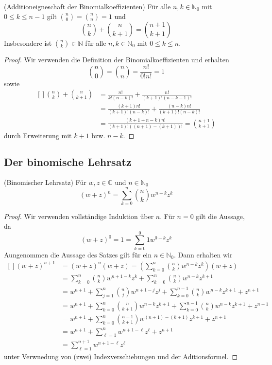 \documentclass[../Analysis1_script.tex]{subfiles}
\begin{document}
\begin{proposition}{(Additioneigneschaft der Binomialkoeffizienten)}
	Für alle $n, k \in \mathbb{N}_0$ mit $0 \leq k \leq n - 1$  gilt $\binom{n}{0} = \binom{n}{n} = 1$ und 
	\[\binom{n}{k} + \binom{n}{k+1} = \binom{n+1}{k+1}\]
	Insbesondere ist $\binom{n}{k} \in \mathbb{N}$ für alle $n, k \in \mathbb{N}_0$ mit $0 \leq k \leq n$.
\end{proposition}

\begin{proof}
	Wir verwenden die Definition der Binomialkoeffizienten und erhalten
	\[\binom{n}{0} = \binom{n}{n} = \frac{n!}{0!n!} = 1\]
	sowie
	\[\begin{aligned}[]
		\binom{n}{k} + \binom{n}{k+1} &= \frac{n!}{k!(n-k)!} + \frac{n!}{(k+1)!(n-k-1)!}\\
		&= \frac{(k+1)n!}{(k+1)!(n-k)!} + \frac{(n-k)n!}{(k+1)!(n-k)!}\\
		&= \frac{(k + 1 + n - k)n!}{(k+1)!((n+1)-(k+1))!} = \binom{n+1}{k+1}
	\end{aligned}\]
	durch Erweiterung mit $k+1$ bzw. $n-k$.
\end{proof}


\subsection{Der binomische Lehrsatz}

\begin{proposition}{(Binomischer Lehrsatz)}
	Für $w, z \in \mathbb{C}$ und $n \in \mathbb{N}_0$
	\[(w + z)^n = \sum_{k=0}^n \binom{n}{k}w^{n-k} z^k\]
\end{proposition}

\begin{proof}
	Wir verwenden vollständige Induktion über $n$. Für $n=0$ gilt die Aussage, da
	\[(w + z)^0 = 1 = \sum_{k=0}^0 1w^{0-k} z^k\]
	Aungenommen die Aussage des Satzes gilt für ein $n \in \mathbb{N}_0$. Dann erhalten wir
	\[\begin{aligned}[]
		(w + z)^{n+1} &= (w + z)^{n}(w + z) = (\sum_{k=0}^n \binom{n}{k}w^{n-k}z^k)(w + z)\\
		&= \sum_{k=0}^n \binom{n}{k}w^{n+1-k}z^k + \sum_{k=0}^n \binom{n}{k}w^{n-k}z^{k+1}\\
		&= w^{n+1} + \sum_{j=1}^n \binom{n}{j}w^{n+1-j}z^j + \sum_{k=0}^{n-1} \binom{n}{k}w^{n-k}z^{k+1} + z^{n+1}\\
		&= w^{n+1} + \sum_{k=0}^n \binom{n}{k+1}w^{n-k}z^{k+1} + \sum_{k=0}^{n-1} \binom{n}{k}w^{n-k}z^{k+1} + z^{n+1}\\
		&= w^{n+1} + \sum_{k=0}^{n}\binom{n+1}{k+1}w^{(n+1)-(k+1)}z^{k+1} + z^{n+1}\\
		&= w^{n+1} + \sum_{\ell=1}^{n}w^{n+1-\ell}z^{\ell} + z^{n+1}\\
		&= \sum_{\ell=1}^{n+1}w^{n+1-\ell}z^{\ell}
	\end{aligned}\]
	unter Verwnedung von (zwei) Indexverschiebungen und der Aditionsformel.
\end{proof}
\end{document}
